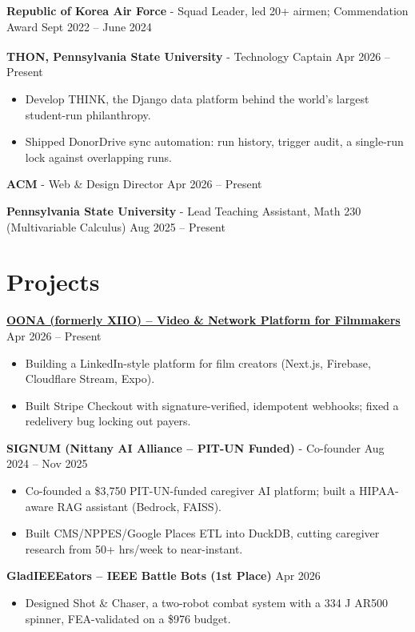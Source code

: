 \documentclass[11pt,a4paper]{article}
\newcommand{\blockspace}{\vspace{0.12em}}
\newenvironment{details}{\begin{itemize}[leftmargin=1.4em, label=\textbullet, topsep=0pt, itemsep=0pt, parsep=0pt, partopsep=0pt]}{\end{itemize}}
\begin{document}
\noindent\textbf{Republic of Korea Air Force} - Squad Leader, led 20+ airmen; Commendation Award \hfill Sept 2022 -- June 2024\par
\blockspace

\noindent\textbf{THON\textsuperscript{\texttrademark}, Pennsylvania State University} - Technology Captain \hfill Apr 2026 -- Present
\begin{details}
\item Develop THINK, the Django data platform behind the world's largest student-run philanthropy.
\item Shipped DonorDrive sync automation: run history, trigger audit, a single-run lock against overlapping runs.
\end{details}
\blockspace

\noindent\textbf{ACM} - Web \& Design Director \hfill Apr 2026 -- Present\par
\blockspace

\noindent\textbf{Pennsylvania State University} - Lead Teaching Assistant, Math 230 (Multivariable Calculus) \hfill Aug 2025 -- Present

\section{Projects}
\noindent\textbf{\href{https://xiio.vercel.app}{OONA (formerly XIIO) – Video \& Network Platform for Filmmakers}} \hfill Apr 2026 -- Present
\begin{details}
\item Building a LinkedIn-style platform for film creators (Next.js, Firebase, Cloudflare Stream, Expo).
\item Built Stripe Checkout with signature-verified, idempotent webhooks; fixed a redelivery bug locking out payers.
\end{details}
\blockspace

\noindent\textbf{SIGNUM (Nittany AI Alliance – PIT-UN Funded)} - Co-founder \hfill Aug 2024 -- Nov 2025
\begin{details}
\item Co-founded a \$3,750 PIT-UN-funded caregiver AI platform; built a HIPAA-aware RAG assistant (Bedrock, FAISS).
\item Built CMS/NPPES/Google Places ETL into DuckDB, cutting caregiver research from 50+ hrs/week to near-instant.
\end{details}
\blockspace

\noindent\textbf{GladIEEEators – IEEE Battle Bots (1st Place)} \hfill Apr 2026
\begin{details}
\item Designed Shot \& Chaser, a two-robot combat system with a 334 J AR500 spinner, FEA-validated on a \$976 budget.
\end{details}
\end{document}

